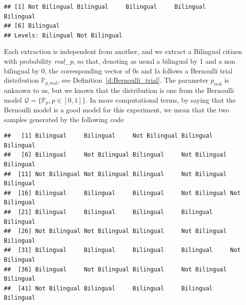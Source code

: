 \begin{example}[Sampling 2]
\begin{knitrout}
\color{fgcolor}\begin{kframe}
\begin{alltt}
 \hlkwb{=} 
 \hlkwb{<-}   
\end{alltt}
\begin{verbatim}
## [1] Not Bilingual Bilingual     Bilingual     Bilingual     Bilingual    
## [6] Bilingual    
## Levels: Bilingual Not Bilingual
\end{verbatim}
\end{kframe}
\end{knitrout}
		Each extraction is independent from another, and we extract a Bilingual citizen with probability \textit{ real\_p}, so that, denoting as usual a bilingual by 1 and a non bilingual by 0,  the corresponding vector of 0s and 1s follows a Bernoulli trial distribution $\mathbb P_{\text{p\_real}}$, see Definition~\ref{d:Bernoulli_trial}. The parameter $p_{\text{real}}$ is unknown to us, but we known that the distribution is one from the Bernoulli model  $\mathcal Q = \{ \mathbb P_p , p \in [0,1]\}$. 
	In more computational terms, by saying that the Bernoulli model is a good model for this experiment, we mean that the two  samples generated by the following code
\begin{knitrout}
\color{fgcolor}\begin{kframe}
\begin{alltt}
 \hlkwb{<-} 
     
\end{alltt}
\begin{verbatim}
##   [1] Bilingual     Bilingual     Not Bilingual Bilingual     Bilingual    
##   [6] Bilingual     Not Bilingual Bilingual     Not Bilingual Bilingual    
##  [11] Not Bilingual Not Bilingual Bilingual     Not Bilingual Bilingual    
##  [16] Bilingual     Bilingual     Bilingual     Not Bilingual Not Bilingual
##  [21] Bilingual     Bilingual     Bilingual     Bilingual     Bilingual    
##  [26] Not Bilingual Not Bilingual Bilingual     Not Bilingual Bilingual    
##  [31] Bilingual     Bilingual     Bilingual     Bilingual     Not Bilingual
##  [36] Bilingual     Not Bilingual Bilingual     Not Bilingual Bilingual    
##  [41] Not Bilingual Bilingual     Bilingual     Bilingual     Bilingual    

\end{verbatim}
\end{kframe}
\end{knitrout}
\end{example}

